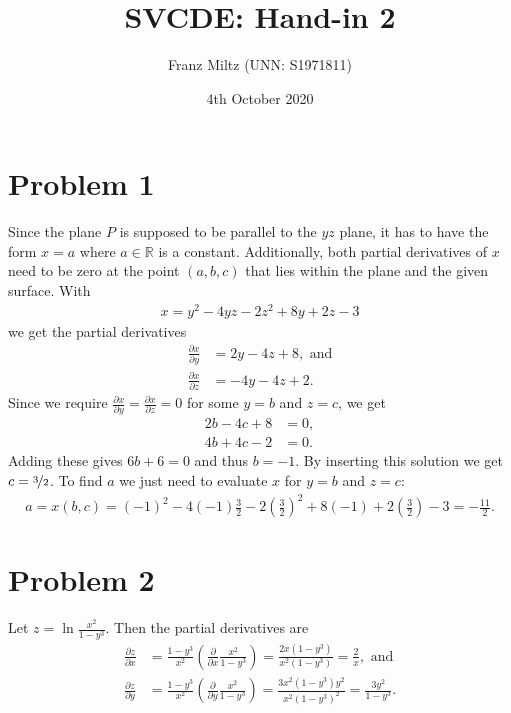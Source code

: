 \documentclass{article}
\title{SVCDE: Hand-in 2}
\author{Franz Miltz (UNN: S1971811)}
\newcommand{\R}{\mathbb{R}}
\newcommand{\p}{\partial }
\begin{document}
\date{4th October 2020}
\maketitle
\section*{Problem 1}
Since the plane $P$ is supposed to be parallel to the $yz$ plane, it
has to have the form $x=a$ where $a\in\R$ is a constant.
Additionally, both partial derivatives of $x$ need to be zero at the
point $(a,b,c)$ that lies within the plane and the given surface.
With
\begin{align*}
  x = y^2 - 4yz - 2z^2 + 8y + 2z -3
\end{align*}
we get the partial derivatives
\begin{align*}
  \frac{\p x}{\p y}&=2y - 4z + 8,\text{ and}\\
  \frac{\p x}{\p z}&=-4y-4z+2.
\end{align*}
Since we require $\frac{\p x}{\p y}=\frac{\p x}{\p z}=0$ for
some $y=b$ and $z=c$, we get
\begin{align*}
  2b - 4c + 8 &= 0,\\
  4b + 4c - 2 &= 0.
\end{align*}
Adding these gives $6b + 6 = 0$ and thus $b=-1$.
By inserting this solution we get $c=\nicefrac{3}{2}$. 
To find $a$ we just need to evaluate $x$ for $y=b$ and $z=c$:
\begin{align*}
  a = x(b,c) = (-1)^2 - 4(-1)\frac{3}{2} - 2\left(\frac{3}{2}\right)^2
      + 8(-1) + 2\left(\frac{3}{2}\right) - 3 = - \frac{11}{2}. 
\end{align*}
\section*{Problem 2}
Let $ z = \ln\frac{x^2}{1-y^3}$. Then the partial derivatives are
\begin{align*}
  \frac{\p z}{\p x}
  &=\frac{1-y^3}{x^2}\left(\frac{\p}{\p x}\frac{x^2}{1-y^3}\right)
  =\frac{2x(1-y^3)}{x^2(1-y^3)}
  =\frac{2}{x}, \text{ and}\\
  \frac{\p z}{\p y}
  &=\frac{1-y^3}{x^2}\left(\frac{\p}{\p y}\frac{x^2}{1-y^3}\right)
  =\frac{3x^2(1-y^3)y^2}{x^2(1-y^3)^2}
  =\frac{3y^2}{1-y^3}.
\end{align*}
\end{document}
